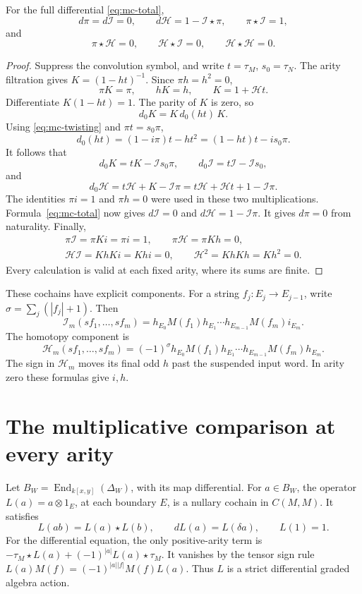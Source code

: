\begin{theorem}
\label{thm:mc-contraction}
For the full differential \eqref{eq:mc-total},
\[
 d\pi=d\mathcal I=0,\qquad
 d\mathcal H=1-\mathcal I\star\pi,\qquad
 \pi\star\mathcal I=1,
\]
and
\[
 \pi\star\mathcal H=0,\qquad
 \mathcal H\star\mathcal I=0,\qquad
 \mathcal H\star\mathcal H=0.
\]
\end{theorem}
\begin{proof}
Suppress the convolution symbol, and write \(t=\tau_M\),
\(s_0=\tau_N\). The arity filtration gives
\(K=(1-ht)^{-1}\). Since \(\pi h=h^2=0\),
\[
 \pi K=\pi,\qquad hK=h,\qquad K=1+\mathcal Ht.
\]
Differentiate \(K(1-ht)=1\). The parity of \(K\) is zero, so
\[
 d_0K=K\,d_0(ht)\,K.
\]
Using \eqref{eq:mc-twisting} and \(\pi t=s_0\pi\),
\[
 d_0(ht)=(1-i\pi)t-ht^2
          =(1-ht)t-i s_0\pi.
\]
It follows that
\[
 d_0K=tK-\mathcal I s_0\pi,\qquad
 d_0\mathcal I=t\mathcal I-\mathcal I s_0,
\]
and
\[
 d_0\mathcal H
   =t\mathcal H+K-\mathcal I\pi
   =t\mathcal H+\mathcal Ht+1-\mathcal I\pi.
\]
The identities \(\pi i=1\) and \(\pi h=0\) were used in these
two multiplications. Formula~\eqref{eq:mc-total} now gives
\(d\mathcal I=0\) and \(d\mathcal H=1-\mathcal I\pi\).
It gives \(d\pi=0\) from naturality.
Finally,
\[
 \begin{gathered}
 \pi\mathcal I=\pi Ki=\pi i=1,\qquad
 \pi\mathcal H=\pi Kh=0,\\
 \mathcal H\mathcal I=KhKi=Khi=0,\qquad
 \mathcal H^2=KhKh=Kh^2=0.
 \end{gathered}
\]
Every calculation is valid at each fixed arity, where its sums
are finite.
\end{proof}

These cochains have explicit components. For a string
\(f_j:E_j\to E_{j-1}\), write
\(\sigma=\sum_j(|f_j|+1)\). Then
\[
 \mathcal I_m(sf_1,\ldots,sf_m)
   =h_{E_0}M(f_1)h_{E_1}\cdots
                h_{E_{m-1}}M(f_m)i_{E_m}.
\]
The homotopy component is
\[
 \mathcal H_m(sf_1,\ldots,sf_m)
   =(-1)^\sigma h_{E_0}M(f_1)h_{E_1}\cdots
                h_{E_{m-1}}M(f_m)h_{E_m}.
\]
The sign in \(\mathcal H_m\) moves its final odd \(h\) past the
suspended input word. In arity zero these formulas give \(i,h\).

\section{The multiplicative comparison at every arity}
\label{sec:mc-all-arities}

Let \(B_W=\operatorname{End}_{k[x,y]}(\Delta_W)\), with its
map differential. For \(a\in B_W\), the operator
\(L(a)=a\otimes1_E\), at each boundary \(E\), is a nullary
cochain in \(C(M,M)\). It satisfies
\[
 L(ab)=L(a)\star L(b),\qquad dL(a)=L(\delta a),\qquad L(1)=1.
\]
For the differential equation, the only positive-arity term is
\(-\tau_M\star L(a)+(-1)^{|a|}L(a)\star\tau_M\).
It vanishes by the tensor sign rule
\(L(a)M(f)=(-1)^{|a||f|}M(f)L(a)\).
Thus \(L\) is a strict differential graded algebra action.

